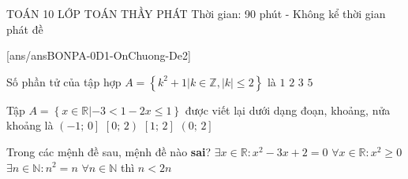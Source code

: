 \begin{name}
	{\tenchude}
	{TOÁN 10}
	{LỚP TOÁN THẦY PHÁT}
	{Thời gian: 90 phút - Không kể thời gian phát đề}
\end{name}
\TN
{}[ans/ansBONPA-0D1-OnChuong-De2]
\begin{ex}%
	Số phần tử của tập hợp $A=\left\{{k^2}+1\big|k\in\mathbb{Z},\left| k\right|\le 2\right\}$ là
	\choice
	{$1$}
	{$2$}
	{\True $3$}
	{$5$}
\end{ex}

\begin{ex}%
	Tập $A=\left\{ x\in\mathbb{R}\left|-3<1-2x\le 1\right.\right\}$ được viết lại dưới dạng đoạn, khoảng, nửa khoảng là
	\choice
	{$\left(-1;\,0\right]$}
	{\True $\left[0;\,2\right)$}
	{$\left[1;\,2\right]$}
	{$\left(0;\,2\right]$}
	\loigiai{
		Ta có $-3<1-2x\le 1\Leftrightarrow-4<-2x\le 0\Leftrightarrow 0\le x<2$.\\
		Do đó $A=\left\{ x\in\mathbb{R}\left| 0\le x<2\right.\right\}=\left[0;\,2\right)$.}
\end{ex}

\begin{ex}%
	Trong các mệnh đề sau, mệnh đề nào \textbf{sai}?
	\choice
	{$\exists x\in\mathbb{R}\colon x^2-3x+2=0$}
	{$\forall x\in\mathbb{R}\colon x^2\ge 0$}
	{$\exists n\in\mathbb{N}\colon n^2=n$}
	{\True $\forall n\in\mathbb{N}$ thì $n<2n$}
\end{ex}

